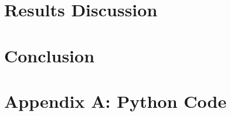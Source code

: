 \documentclass[twocolumn,10pt]{asme2ej}
\begin{document}
\section{Results Discussion}

\section{Conclusion}

\nocite{*}



\clearpage
\onecolumn
\appendix       %
\section*{Appendix A: Python Code}




\end{document}
